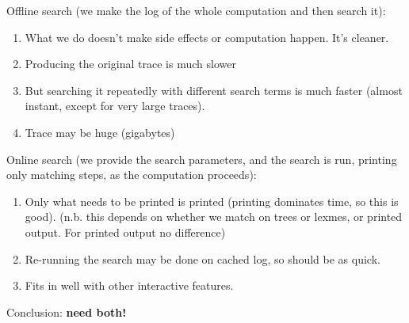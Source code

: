 \documentclass[10pt]{article}
\begin{document}
Offline search (we make the log of the whole computation and then search it):

\begin{enumerate}
\item What we do doesn't make side effects or computation happen. It's cleaner.
\item Producing the original trace is much slower
\item But searching it repeatedly with different search terms is much faster (almost instant, except for very large traces).
\item Trace may be huge (gigabytes)
\end{enumerate}

\noindent Online search (we provide the search parameters, and the search is run, printing only matching steps, as the computation proceeds):

\begin{enumerate}
\item Only what needs to be printed is printed (printing dominates time, so this is good). (n.b. this depends on whether we match on trees or lexmes, or printed output. For printed output no difference)
\item Re-running the search may be done on cached log, so should be as quick.
\item Fits in well with other interactive features.
\end{enumerate}

\noindent Conclusion: \textbf{need both!}
\end{document}
